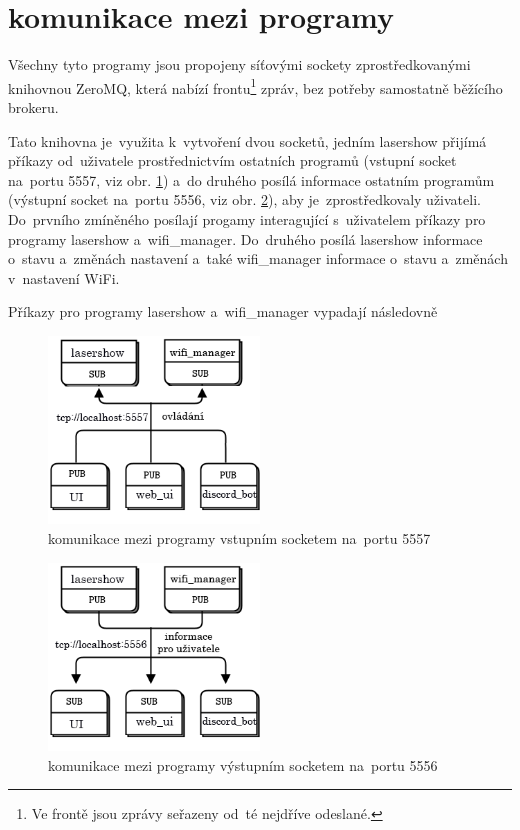 \section{komunikace mezi programy} \label{sec:comms}
Všechny tyto programy jsou propojeny síťovými sockety zprostředkovanými knihovnou ZeroMQ, která nabízí frontu\footnote{Ve frontě jsou zprávy seřazeny od~té nejdříve odeslané.} zpráv, bez potřeby samostatně běžícího brokeru.

Tato knihovna je~využita k~vytvoření dvou socketů, jedním lasershow přijímá příkazy od~uživatele prostřednictvím ostatních programů (vstupní socket na~portu 5557, viz obr. \ref{fig:tcp5557}) a~do druhého posílá informace ostatním programům (výstupní socket na~portu 5556, viz obr. \ref{fig:tcp5556}), aby je~zprostředkovaly uživateli. Do~prvního zmíněného posílají progamy interagující s~uživatelem příkazy pro programy lasershow a~wifi\_manager. Do~druhého posílá lasershow informace o~stavu a~změnách nastavení  a~také wifi\_manager informace o~stavu a~změnách v~nastavení WiFi.

Příkazy pro programy lasershow a~wifi\_manager vypadají následovně

\begin{figure}[!htb]
  \centering
  \includegraphics[width=0.5\textwidth]{img/tcp5557.png}
  \caption{\label{fig:tcp5557}komunikace mezi programy vstupním socketem na~portu 5557}
\end{figure}
\begin{figure}[!htb]
  \centering
  \includegraphics[width=0.5\textwidth]{img/tcp5556.png}
  \caption{\label{fig:tcp5556}komunikace mezi programy výstupním socketem na~portu 5556}
\end{figure}